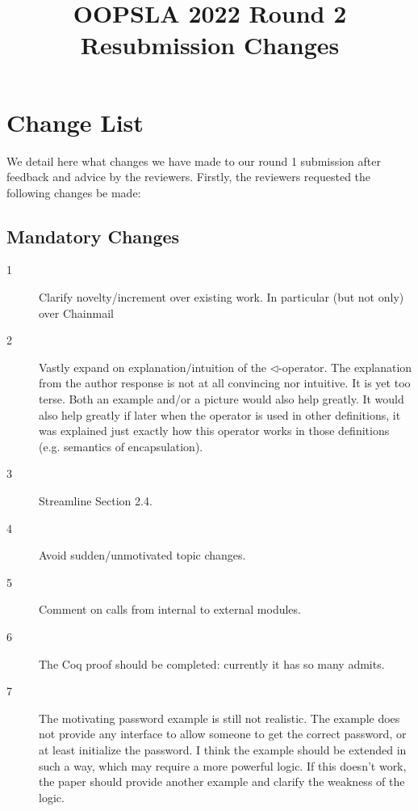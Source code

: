 \documentclass[11pt]{amsart}
\title{OOPSLA 2022 Round 2 Resubmission Changes}
\begin{document}
\maketitle

 \section{Change List}
 We detail here what changes we have made to our 
 round 1 submission after feedback and advice by 
 the reviewers. Firstly, the reviewers requested 
 the following changes be made:
 
 \subsection{Mandatory Changes}

 \begin{description}
 
 \item[1]
 Clarify novelty/increment over existing work. In particular (but not only) over Chainmail 
 
 \item[2]
 Vastly expand on explanation/intuition of the 
 $\triangleleft$-operator. The explanation from the author response is not at all 
 convincing nor intuitive. It is yet too terse. Both an example and/or a picture 
 would also help greatly. It would also help greatly if later when the operator is 
 used in other definitions, it was explained just exactly how this operator works 
 in those definitions (e.g. semantics of encapsulation).
 
 \item[3]
 Streamline Section 2.4.
 
 \item[4]
 Avoid sudden/unmotivated topic changes.
 
 \item[5]
 Comment on calls from internal to external modules.
 
 \item[6]
 The Coq proof should be completed: currently it has so many admits.
 
 \item[7]
 The motivating password example is still not realistic. The example does not provide any interface to allow someone to get the correct password, or at least initialize the password. I think the example should be extended in such a way, which may require a more powerful logic. If this doesn't work, the paper should provide another example and clarify the weakness of the logic.
 
 \end{description}
 
\end{document}
